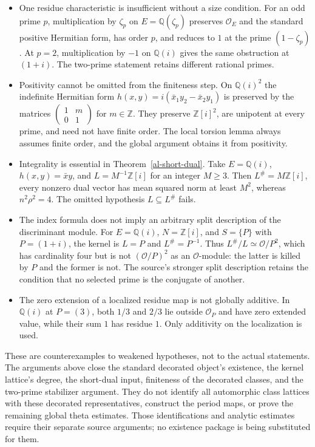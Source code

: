 \begin{itemize}
\item One residue characteristic is insufficient without a size
condition. For an odd prime $p$, multiplication by $\zeta_p$
on $E=\mathbb Q(\zeta_p)$ preserves $\mathcal O_E$ and the
standard positive Hermitian form, has order $p$, and reduces to
$1$ at the prime $(1-\zeta_p)$. At $p=2$, multiplication by $-1$
on $\mathbb Q(i)$ gives the same obstruction at $(1+i)$.
The two-prime statement retains different rational primes.
\item Positivity cannot be omitted from the finiteness step.
On $\mathbb Q(i)^2$ the indefinite Hermitian form
$h(x,y)=i(\bar x_1y_2-\bar x_2y_1)$ is preserved by the matrices
$\left(\begin{smallmatrix}1&m\\0&1\end{smallmatrix}\right)$
for $m\in\mathbb Z$. They preserve $\mathbb Z[i]^2$,
are unipotent at every prime, and need
not have finite order. The local torsion lemma always assumes
finite order, and the global argument obtains it from positivity.
\item Integrality is essential in Theorem~\ref{al-short-dual}.
Take $E=\mathbb Q(i)$, $h(x,y)=\bar xy$, and
$L=M^{-1}\mathbb Z[i]$ for an integer $M\geq3$.
Then $L^\#=M\mathbb Z[i]$, every nonzero dual vector has mean
squared norm at least $M^2$, whereas $n^2\rho^2=4$.
The omitted hypothesis $L\subseteq L^\#$ fails.
\item The index formula does not imply an arbitrary split
description of the discriminant module. For
$E=\mathbb Q(i)$, $N=\mathbb Z[i]$, and $S=\{P\}$ with
$P=(1+i)$, the kernel is $L=P$ and $L^\#=P^{-1}$.
Thus $L^\#/L\simeq\mathcal O/P^2$, which has cardinality
four but is not $(\mathcal O/P)^2$ as an $\mathcal O$-module:
the latter is killed by $P$ and the former is not.
The source's stronger split description retains the condition
that no selected prime is the conjugate of another.
\item The zero extension of a localized residue map is not
globally additive. In $\mathbb Q(i)$ at $P=(3)$,
both $1/3$ and $2/3$ lie outside $\mathcal O_P$ and have
zero extended value, while their sum $1$ has residue $1$.
Only additivity on the localization is used.
\end{itemize}

These are counterexamples to weakened hypotheses, not to the actual
statements. The arguments above close the standard decorated object's
existence, the kernel lattice's degree, the short-dual input, finiteness
of the decorated classes, and the two-prime stabilizer argument.
They do not identify all automorphic
class lattices with these decorated representatives, construct the
period maps, or prove the remaining global theta estimates.
Those identifications and analytic estimates require their separate
source arguments; no existence package is being substituted for them.


